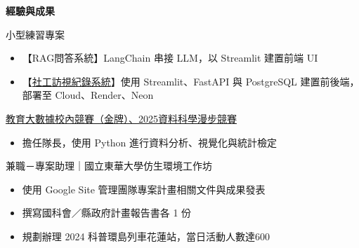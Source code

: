 \documentclass[12pt,aspectratio=169]{beamer}
\begin{document}
\begin{frame}{\textbf{經驗與成果}}
  
  
  \begin{block}{小型練習專案}
    \begin{itemize}
      \item【RAG問答系統】LangChain 串接 LLM，以 Streamlit 建置前端 UI
      \item【\href{https://socialworkerubing.streamlit.app/}{社工訪視紀錄系統}】使用 Streamlit、FastAPI 與 PostgreSQL 建置前後端，部署至 Cloud、Render、Neon
    \end{itemize}
  \end{block}

  \begin{block}{\href{https://ppt.cc/f5zmzx}{教育大數據校內競賽（金牌）、2025資料科學漫步競賽}}
    \begin{itemize}
      \item 擔任隊長，使用 Python 進行資料分析、視覺化與統計檢定
    \end{itemize}
  \end{block}

  \begin{block}{兼職－專案助理｜國⽴東華⼤學仿生環境工作坊}
    \begin{itemize}
       \item 使用 Google Site 管理團隊專案計畫相關⽂件與成果發表
       \item 撰寫國科會／縣政府計畫報告書各 1 份
       \item 規劃辦理 2024 科普環島列車花蓮站，當⽇活動⼈數達600
    \end{itemize}
  \end{block}


\end{frame}
\end{document}
